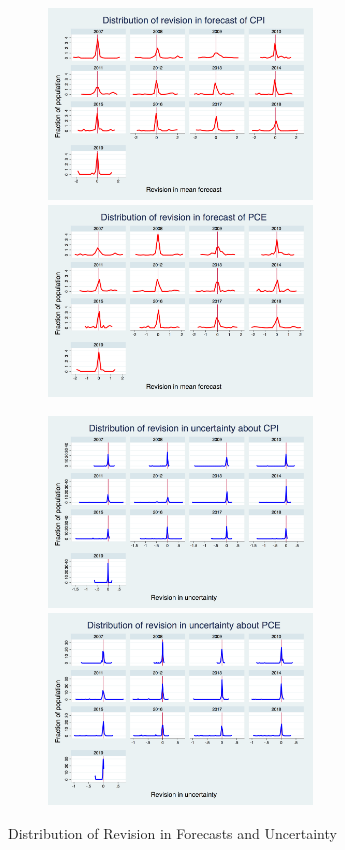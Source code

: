 \documentclass[]{article}
\begin{document}
	
	\begin{figure}[ht]
		\begin{subfigure}[b]{0.5\textwidth}
		\centering
		\includegraphics[width=7cm]{figures/PRCCPIMean01_rv_true_hist.png} 
		\smallskip
		\includegraphics[width=7cm]{figures/PRCPCEMean01_rv_true_hist.png} 
		\end{subfigure}
		   \hfill 
		\begin{subfigure}[b]{0.5\textwidth}
		\includegraphics[width=7cm]{figures/PRCCPIVar01_rv_true_hist.png}  
		\smallskip
		\includegraphics[width=7cm]{figures/PRCPCEVar01_rv_true_hist.png} 
		\end{subfigure}
		\caption{Distribution of Revision in Forecasts and Uncertainty}
		\label{RevisionHist}
	\end{figure}
	
\end{document}
